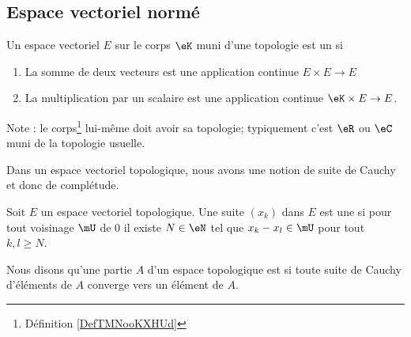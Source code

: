 \subsection{Espace vectoriel normé}

\begin{definition}
    Un espace vectoriel \( E\) sur le corps \( \eK\) muni d'une topologie est un  si
    \begin{enumerate}
        \item
            La somme de deux vecteurs est une application continue \( E\times E\to E\)
        \item
            La multiplication par un scalaire est une application continue \( \eK\times E\to E\).
    \end{enumerate}
    Note : le corps\footnote{Définition \ref{DefTMNooKXHUd}} lui-même doit avoir sa topologie; typiquement c'est \( \eR\) ou \( \eC\) muni de la topologie usuelle.
\end{definition}
Dans un espace vectoriel topologique, nous avons une notion de suite de Cauchy et donc de complétude.

\begin{definition}   \label{DefZSnlbPc}
    Soit \( E\) un espace vectoriel topologique. Une suite \( (x_k)\) dans \( E\) est une  si pour tout voisinage \( \mU\) de \( 0\) il existe \( N\in \eN\) tel que \( x_k-x_l\in\mU\) pour tout \( k,l\geq N\).
\end{definition}

\begin{definition}      \label{DEFooVQDBooNxprFU}
    Nous disons qu'une partie \( A\) d'un espace topologique est  si toute suite de Cauchy d'éléments de \( A\) converge vers un élément de \( A\).
\end{definition}

